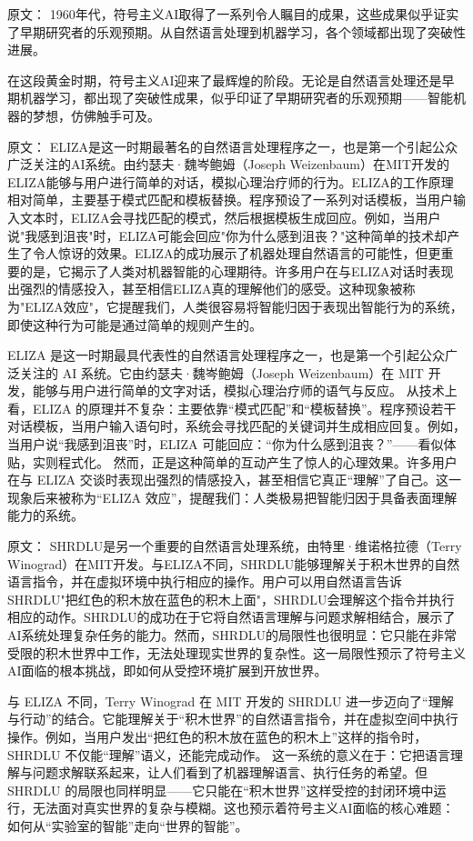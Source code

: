 原文：
1960年代，符号主义AI取得了一系列令人瞩目的成果，这些成果似乎证实了早期研究者的乐观预期。从自然语言处理到机器学习，各个领域都出现了突破性进展。

在这段黄金时期，符号主义AI迎来了最辉煌的阶段。无论是自然语言处理还是早期机器学习，都出现了突破性成果，似乎印证了早期研究者的乐观预期——智能机器的梦想，仿佛触手可及。

原文：
ELIZA是这一时期最著名的自然语言处理程序之一，也是第一个引起公众广泛关注的AI系统。由约瑟夫·魏岑鲍姆（Joseph Weizenbaum）在MIT开发的ELIZA能够与用户进行简单的对话，模拟心理治疗师的行为。ELIZA的工作原理相对简单，主要基于模式匹配和模板替换。程序预设了一系列对话模板，当用户输入文本时，ELIZA会寻找匹配的模式，然后根据模板生成回应。例如，当用户说"我感到沮丧"时，ELIZA可能会回应"你为什么感到沮丧？"这种简单的技术却产生了令人惊讶的效果。ELIZA的成功展示了机器处理自然语言的可能性，但更重要的是，它揭示了人类对机器智能的心理期待。许多用户在与ELIZA对话时表现出强烈的情感投入，甚至相信ELIZA真的理解他们的感受。这种现象被称为"ELIZA效应"，它提醒我们，人类很容易将智能归因于表现出智能行为的系统，即使这种行为可能是通过简单的规则产生的。

ELIZA 是这一时期最具代表性的自然语言处理程序之一，也是第一个引起公众广泛关注的 AI 系统。它由约瑟夫·魏岑鲍姆（Joseph Weizenbaum）在 MIT 开发，能够与用户进行简单的文字对话，模拟心理治疗师的语气与反应。  
从技术上看，ELIZA 的原理并不复杂：主要依靠“模式匹配”和“模板替换”。程序预设若干对话模板，当用户输入语句时，系统会寻找匹配的关键词并生成相应回复。例如，当用户说“我感到沮丧”时，ELIZA 可能回应：“你为什么感到沮丧？”——看似体贴，实则程式化。  
然而，正是这种简单的互动产生了惊人的心理效果。许多用户在与 ELIZA 交谈时表现出强烈的情感投入，甚至相信它真正“理解”了自己。这一现象后来被称为“ELIZA 效应”，提醒我们：人类极易把智能归因于具备表面理解能力的系统。

原文：
SHRDLU是另一个重要的自然语言处理系统，由特里·维诺格拉德（Terry Winograd）在MIT开发。与ELIZA不同，SHRDLU能够理解关于积木世界的自然语言指令，并在虚拟环境中执行相应的操作。用户可以用自然语言告诉SHRDLU"把红色的积木放在蓝色的积木上面"，SHRDLU会理解这个指令并执行相应的动作。SHRDLU的成功在于它将自然语言理解与问题求解相结合，展示了AI系统处理复杂任务的能力。然而，SHRDLU的局限性也很明显：它只能在非常受限的积木世界中工作，无法处理现实世界的复杂性。这一局限性预示了符号主义AI面临的根本挑战，即如何从受控环境扩展到开放世界。

与 ELIZA 不同，Terry Winograd 在 MIT 开发的 SHRDLU 进一步迈向了“理解与行动”的结合。它能理解关于“积木世界”的自然语言指令，并在虚拟空间中执行操作。例如，当用户发出“把红色的积木放在蓝色的积木上”这样的指令时，SHRDLU 不仅能“理解”语义，还能完成动作。  
这一系统的意义在于：它把语言理解与问题求解联系起来，让人们看到了机器理解语言、执行任务的希望。但 SHRDLU 的局限也同样明显——它只能在“积木世界”这样受控的封闭环境中运行，无法面对真实世界的复杂与模糊。这也预示着符号主义AI面临的核心难题：如何从“实验室的智能”走向“世界的智能”。


